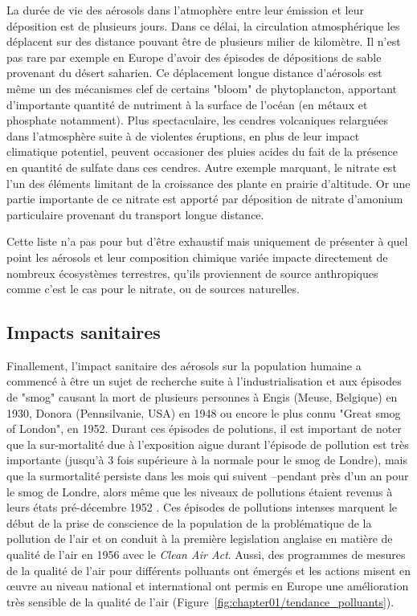 La durée de vie des aérosols dans l'atmophère entre leur émission et leur déposition est
de plusieurs jours. Dans ce délai, la circulation atmosphérique les déplacent sur des
distance pouvant être de plusieurs milier de kilomètre. Il n'est pas rare par exemple en
Europe d'avoir des épisodes de dépositions de sable provenant du désert saharien. Ce
déplacement longue distance d'aérosols est même un des mécanismes clef de certains "bloom"
de phytoplancton, apportant d'importante quantité de nutriment à la surface de l'océan (en
métaux et phosphate notamment).
Plus spectaculaire, les cendres volcaniques relarguées dans l'atmosphère suite à de
violentes éruptions, en plus de leur impact climatique potentiel, peuvent occasioner des
pluies acides du fait de la présence en quantité de sulfate dans ces cendres.
Autre exemple marquant, le nitrate est l'un des éléments limitant de la croissance des
plante en prairie d'altitude. Or une partie importante de ce nitrate est apporté par
déposition de nitrate d'amonium particulaire provenant du transport longue distance.

Cette liste n'a pas pour but d'être exhaustif mais uniquement de présenter à quel point
les aérosols et leur composition chimique variée impacte directement de nombreux
écosystèmes terrestres, qu'ils proviennent de source anthropiques comme c'est le cas pour le
nitrate, ou de sources naturelles.

\subsection{Impacts sanitaires}%
\label{sub:impacts_sanitaires}

Finallement, l'impact sanitaire des aérosols sur la population humaine a commencé à être
un sujet de recherche suite à l'industrialisation et aux épisodes de "smog" causant la
mort de plusieurs personnes à Engis (Meuse, Belgique) en 1930, Donora (Pennsilvanie, USA)
en 1948 ou encore le plus connu "Great smog of London", en 1952. Durant ces épisodes de
polutions, il est important de noter que la sur-mortalité due à l'exposition aigue durant
l'épisode de pollution est très importante (jusqu'à 3 fois supérieure à la normale pour le
smog de Londre), mais que la surmortalité persiste dans les mois qui suivent --pendant
près d'un an pour le smog de Londre, alors même que les niveaux de pollutions étaient
revenus à leurs états pré-décembre 1952 \autocite{bellReassessment2001}.
Ces épisodes de pollutions intenses marquent le début de la prise de conscience de la
population de la problématique de la pollution de l'air et on conduit à la première
legislation anglaise en matière de qualité de l'air en 1956 avec le \textit{Clean Air
Act}. Aussi, des programmes de mesures de la qualité de l'air pour différents polluants
ont émergés et les actions misent en œuvre au niveau national et international ont permis
en Europe une amélioration très sensible de la qualité de l'air (Figure~\ref{fig:chapter01/tendance_polluants}).

